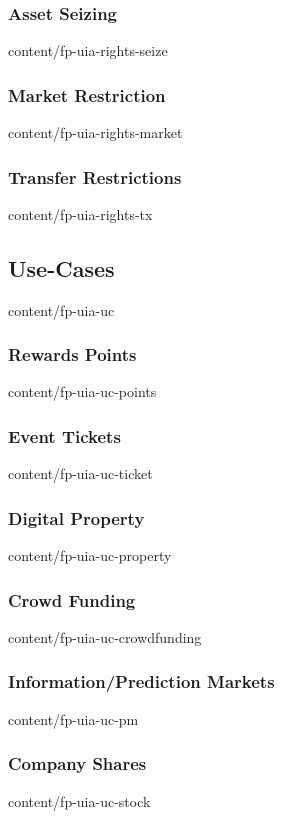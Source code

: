 \documentclass{btswhitepaper}
\begin{document}
\subsubsection  { Asset Seizing                                    }  { content/fp-uia-rights-seize    } 
\subsubsection  { Market Restriction                               }  { content/fp-uia-rights-market   } 
\subsubsection  { Transfer Restrictions                            }  { content/fp-uia-rights-tx       } 
\subsection     { Use-Cases                                        }  { content/fp-uia-uc              } 
\subsubsection  { Rewards Points                                   }  { content/fp-uia-uc-points       } 
\subsubsection  { Event Tickets                                    }  { content/fp-uia-uc-ticket       } 
\subsubsection  { Digital Property                                 }  { content/fp-uia-uc-property     } 
\subsubsection  { Crowd Funding                                    }  { content/fp-uia-uc-crowdfunding } 
\subsubsection  { Information/Prediction Markets                   }  { content/fp-uia-uc-pm           } 
\subsubsection  { Company Shares                                   }  { content/fp-uia-uc-stock        } 
\end{document}
